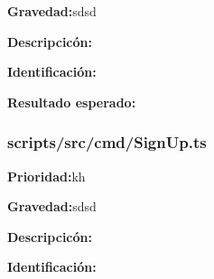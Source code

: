 \documentclass{article}
\begin{document}
            \endgroup

            \begingroup
            \noindent
            \leftskip 35pt 
            \rightskip 0pt 
            \vspace{10pt}
            \textbf{Gravedad:}sdsd

            \endgroup
                
            \begingroup
            \noindent
            \leftskip 35pt 
            \rightskip 0pt 
            \vspace{10pt}
            \textbf{Descripcicón:}
        
            \endgroup

            \begingroup
            \noindent
            \leftskip 35pt 
            \rightskip 0pt 
            \vspace{10pt}
            \textbf{Identificación:}
            
            \endgroup

            \begingroup
            \noindent
            \leftskip 35pt 
            \rightskip 0pt 
            \vspace{10pt}
            \textbf{Resultado esperado:}
        
            \endgroup
        \subsubsection{scripts/src/cmd/SignUp.ts}
        \begingroup
        \noindent
        \leftskip 35pt 
        \rightskip 0pt 
        \vspace{10pt}
        \textbf{Prioridad:}kh

        \endgroup

        \begingroup
        \noindent
        \leftskip 35pt 
        \rightskip 0pt 
        \vspace{10pt}
        \textbf{Gravedad:}sdsd

        \endgroup
            
        \begingroup
        \noindent
        \leftskip 35pt 
        \rightskip 0pt 
        \vspace{10pt}
        \textbf{Descripcicón:}
    
        \endgroup

        \begingroup
        \noindent
        \leftskip 35pt 
        \rightskip 0pt 
        \vspace{10pt}
        \textbf{Identificación:}
        
        \endgroup
\end{document}
